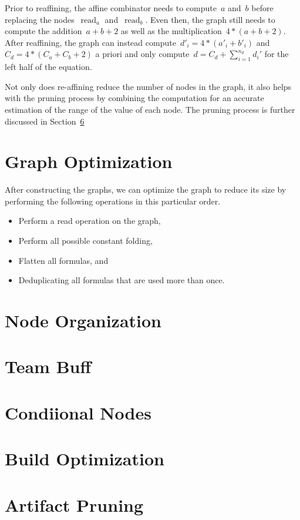 \documentclass{article}
\DeclareMathOperator{\readNode}{read}
\begin{document}
Prior to reaffining, the affine combinator needs to compute~$a$ and~$b$ before replacing the nodes~$\readNode_a$ and~$\readNode_b$.
Even then, the graph still needs to compute the addition~$a + b + 2$ as well as the multiplication~$4 * (a + b + 2)$.
After reaffining, the graph can instead compute~$d'_i = 4 * (a'_i + b'_i)$ and~$C_d = 4 * (C_a + C_b + 2)$ a priori and only compute~$d=C_d + \sum_{i=1}^{n_d}d_i'$ for the left half of the equation.

Not only does re-affining reduce the number of nodes in the graph, it also helps with the pruning process by combining the computation for an accurate estimation of the range of the value of each node.
The pruning process is further discussed in Section~\ref{sec:pruning}

\section{Graph Optimization}

After constructing the graphs, we can optimize the graph to reduce its size by performing the following operations in this particular order.
%
\begin{itemize}
	\item Perform a read operation on the graph,
	\item Perform all possible constant folding,
	\item Flatten all formulas, and
	\item Deduplicating all formulas that are used more than once.
\end{itemize}

\section{Node Organization}

\section{Team Buff}
\section{Condiional Nodes}
\section{Build Optimization}
\section{Artifact Pruning}
\label{sec:pruning}
\end{document}
